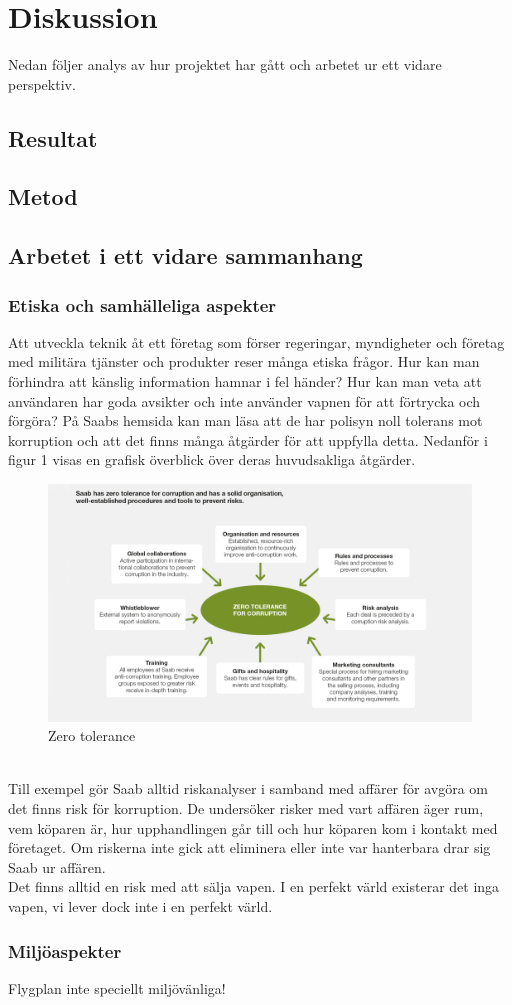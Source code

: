 \section{Diskussion}
Nedan följer analys av hur projektet har gått och arbetet ur ett vidare perspektiv.  

\subsection{Resultat}

\subsection{Metod}

\subsection{Arbetet i ett vidare sammanhang}

\subsubsection{Etiska och samhälleliga aspekter}
Att utveckla teknik åt ett företag som förser regeringar, myndigheter och företag med militära tjänster och produkter reser många etiska frågor. Hur kan man förhindra att känslig information hamnar i fel händer? Hur kan man veta att användaren har goda avsikter och inte använder vapnen för att förtrycka och förgöra? På Saabs hemsida kan man läsa att de har polisyn noll tolerans mot korruption och att det finns många åtgärder för att uppfylla detta. Nedanför i figur 1 visas en grafisk överblick över deras huvudsakliga åtgärder.
\\
\leavevmode
\begin{figure}[h]
	\centering
	\includegraphics[scale=1.5]{grafik/modell_zero_corruption_1140x640.png}
	\caption{Zero tolerance}
	\label{fig:zero tolerance}	
\end{figure}  
\\
Till exempel gör Saab alltid riskanalyser i samband med affärer för avgöra om det finns risk för korruption. De undersöker risker med vart affären äger rum, vem köparen är, hur upphandlingen går till och hur köparen kom i kontakt med företaget. Om riskerna inte gick att eliminera eller inte var hanterbara drar sig Saab ur affären.             
\\
Det finns alltid en risk med att sälja vapen. I en perfekt värld existerar det inga vapen, vi lever dock inte i en perfekt värld.


\subsubsection{Miljöaspekter}
Flygplan inte speciellt miljövänliga!